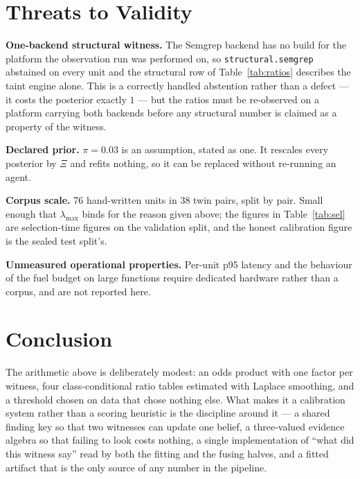 \documentclass[conference]{IEEEtran}
\begin{document}
\section{Threats to Validity}

\textbf{One-backend structural witness.} The Semgrep backend has no build for the platform the
observation run was performed on, so \texttt{structural.semgrep} abstained on every unit and
the structural row of Table~\ref{tab:ratios} describes the taint engine alone. This is a
correctly handled abstention rather than a defect --- it costs the posterior exactly $1$ ---
but the ratios must be re-observed on a platform carrying both backends before any structural
number is claimed as a property of the witness.

\textbf{Declared prior.} $\pi=0.03$ is an assumption, stated as one. It rescales every
posterior by $\Xi$ and refits nothing, so it can be replaced without re-running an agent.

\textbf{Corpus scale.} 76 hand-written units in 38 twin pairs, split by pair. Small enough that
$\lambda_{\max}$ binds for the reason given above; the figures in Table~\ref{tab:sel} are
selection-time figures on the validation split, and the honest calibration figure is the sealed
test split's.

\textbf{Unmeasured operational properties.} Per-unit p95 latency and the behaviour of the fuel
budget on large functions require dedicated hardware rather than a corpus, and are not reported
here.

\section{Conclusion}

The arithmetic above is deliberately modest: an odds product with one factor per witness, four
class-conditional ratio tables estimated with Laplace smoothing, and a threshold chosen on data
that chose nothing else. What makes it a calibration system rather than a scoring heuristic is
the discipline around it --- a shared finding key so that two witnesses can update one belief, a
three-valued evidence algebra so that failing to look costs nothing, a single implementation of
``what did this witness say'' read by both the fitting and the fusing halves, and a fitted
artifact that is the only source of any number in the pipeline.
\end{document}

